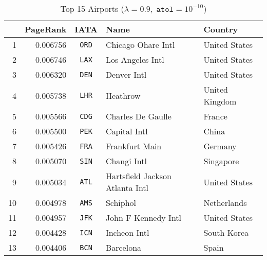 
\begin{table}[H]
\centering
\caption{Top 15 Airports ($\lambda = 0.9,\; \texttt{atol} = 10^{-10}$)}
\label{tab:top20}
\begin{tabular}{rrcll}
\toprule
   & PageRank & IATA          & Name                            & Country              \\ \midrule
1  & 0.006756 & \texttt{ORD}  & Chicago Ohare Intl              & United States        \\
2  & 0.006746 & \texttt{LAX}  & Los Angeles Intl                & United States        \\
3  & 0.006320 & \texttt{DEN}  & Denver Intl                     & United States        \\
4  & 0.005738 & \texttt{LHR}  & Heathrow                        & United Kingdom       \\
5  & 0.005566 & \texttt{CDG}  & Charles De Gaulle               & France               \\
6  & 0.005500 & \texttt{PEK}  & Capital Intl                    & China                \\
7  & 0.005426 & \texttt{FRA}  & Frankfurt Main                  & Germany              \\
8  & 0.005070 & \texttt{SIN}  & Changi Intl                     & Singapore            \\
9  & 0.005034 & \texttt{ATL}  & Hartsfield Jackson Atlanta Intl & United States        \\
10 & 0.004978 & \texttt{AMS}  & Schiphol                        & Netherlands          \\
11 & 0.004957 & \texttt{JFK}  & John F Kennedy Intl             & United States        \\
12 & 0.004428 & \texttt{ICN}  & Incheon Intl                    & South Korea          \\
13 & 0.004406 & \texttt{BCN}  & Barcelona                       & Spain                \\

\end{tabular}
\end{table}
